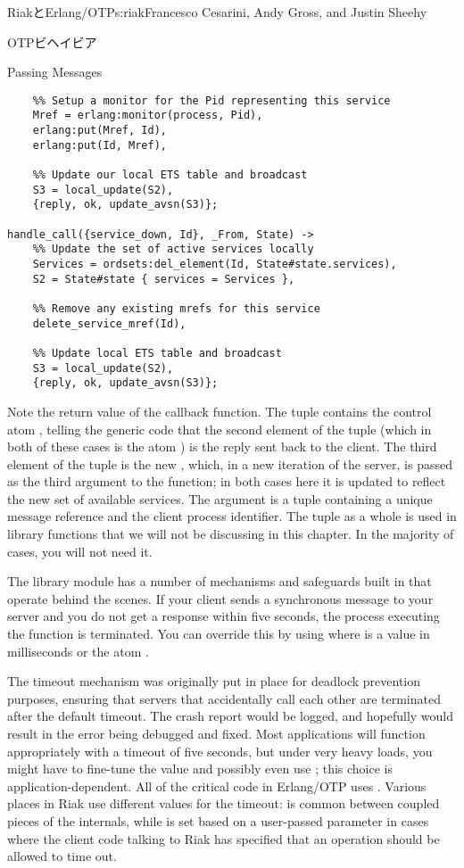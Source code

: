 \begin{aosachapter}{RiakとErlang/OTP}{s:riak}{Francesco Cesarini, Andy Gross, and Justin Sheehy}
\begin{aosasect1}{OTPビヘイビア}
\begin{aosasect2}{Passing Messages}
\begin{verbatim}
    %% Setup a monitor for the Pid representing this service
    Mref = erlang:monitor(process, Pid),
    erlang:put(Mref, Id),
    erlang:put(Id, Mref),

    %% Update our local ETS table and broadcast
    S3 = local_update(S2),
    {reply, ok, update_avsn(S3)};

handle_call({service_down, Id}, _From, State) ->
    %% Update the set of active services locally
    Services = ordsets:del_element(Id, State#state.services),
    S2 = State#state { services = Services },

    %% Remove any existing mrefs for this service
    delete_service_mref(Id),

    %% Update local ETS table and broadcast
    S3 = local_update(S2),
    {reply, ok, update_avsn(S3)};
\end{verbatim}

\noindent Note the return value of the callback function. The tuple contains the
control atom , telling the  generic code
that the second element of the tuple (which in both of these cases is
the atom ) is the reply sent back to the client. The third
element of the tuple is the new , which, in a new
iteration of the server, is passed as the third argument to the
 function; in both cases here it is updated to
reflect the new set of available services. The argument 
is a tuple containing a unique message reference and the client
process identifier. The tuple as a whole is used in library functions
that we will not be discussing in this chapter. In the majority of
cases, you will not need it.

The  library module has a number of mechanisms and
safeguards built in that operate behind the scenes. If your client
sends a synchronous message to your server and you do not get a
response within five seconds, the process executing the 
function is terminated. You can override this by using
 where 
is a value in milliseconds or the atom .

The timeout mechanism was originally put in place for deadlock
prevention purposes, ensuring that servers that accidentally call each
other are terminated after the default timeout. The crash report would
be logged, and hopefully would result in the error being debugged and
fixed. Most applications will function appropriately with a timeout of
five seconds, but under very heavy loads, you might have to fine-tune
the value and possibly even use ; this choice is
application-dependent. All of the critical code in Erlang/OTP uses
.  Various places in Riak use different values for the
timeout:  is common between coupled pieces of the
internals, while  is set based on a user-passed
parameter in cases where the client code talking to Riak has specified
that an operation should be allowed to time out.


\end{aosasect2}
\end{aosasect1}
\end{aosachapter}
